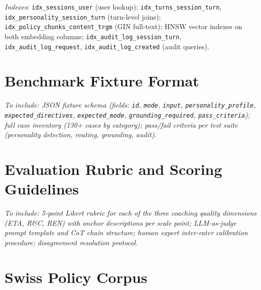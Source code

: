 \documentclass[10pt,a4paper]{report}
\begin{document}
\noindent\textit{Indexes}: \texttt{idx\_sessions\_user} (user lookup); \texttt{idx\_turns\_session\_turn}, \texttt{idx\_personality\_session\_turn} (turn-level joins); \texttt{idx\_policy\_chunks\_content\_trgm} (GIN full-text); HNSW vector indexes on both embedding columns; \texttt{idx\_audit\_log\_session\_turn}, \texttt{idx\_audit\_log\_request}, \texttt{idx\_audit\_log\_created} (audit queries).

\chapter{Benchmark Fixture Format}
\label{app:fixtures}

\begin{tcolorbox}[colback=gray!6!white, colframe=gray!50!black, title=\textbf{Placeholder --- Benchmark Fixture Format}, left=4pt, right=4pt]
\textit{To include: JSON fixture schema (fields: \texttt{id}, \texttt{mode}, \texttt{input}, \texttt{personality\_profile}, \texttt{expected\_directives}, \texttt{expected\_mode}, \texttt{grounding\_required}, \texttt{pass\_criteria}); full case inventory (130+ cases by category); pass/fail criteria per test suite (personality detection, routing, grounding, audit).}
\end{tcolorbox}

\chapter{Evaluation Rubric and Scoring Guidelines}
\label{app:rubric}

\begin{tcolorbox}[colback=gray!6!white, colframe=gray!50!black, title=\textbf{Placeholder --- Evaluation Rubric}, left=4pt, right=4pt]
\textit{To include: 5-point Likert rubric for each of the three coaching quality dimensions (ETA, R\&C, REN) with anchor descriptions per scale point; LLM-as-judge prompt template and CoT chain structure; human expert inter-rater calibration procedure; disagreement resolution protocol.}
\end{tcolorbox}

\chapter{Swiss Policy Corpus}
\label{app:corpus}
\end{document}
